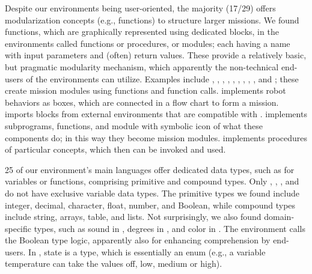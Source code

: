  Despite our environments being user-oriented, the majority (17/29) offers modularization concepts (e.g., functions) to structure larger missions. We found functions, which are graphically represented using dedicated blocks, in the environments called functions or procedures, or modules; each having a name with input parameters and (often) return values. These provide a relatively basic, but pragmatic modularity mechanism, which apparently the non-technical end-users of the environments can utilize.
Examples include \metabot, \ardublockly, \openroberta, \choregraphe, \sphero, \robotmesh, \metabot, \makeblock, \ozoblockly, and \turtlebot; these create mission modules using functions and function calls. \choregraphe implements robot behaviors as boxes, which are connected in a flow chart to form a mission. \lego imports blocks from external environments that are compatible with \lego. \trik implements subprograms, functions, and module with symbolic icon of what these components do; in this way they become mission modules. \picaxe implements procedures of particular concepts, which then can be invoked and used. %



 25 of our environment's main languages offer dedicated data types, such as for variables or functions, comprising primitive and compound types. Only \flyaq, \missionlab, \tivipe, and \trik do not have exclusive variable data types. The primitive types we found include integer, decimal, character, float, number, and Boolean, while compound types include string, arrays, table, and lists. Not surprisingly, we also found domain-specific types, such as sound in \ozoblockly, degrees in \tello, and color in \sphero. The environment \lego calls the Boolean type logic, apparently also for enhancing comprehension by end-users. In \aseba, state is a type, which is essentially an enum (e.g., a variable temperature can take the values off, low, medium or high). %

